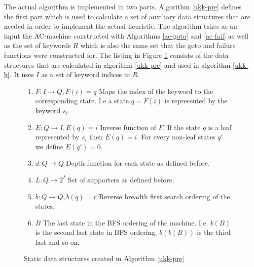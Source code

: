 \documentclass[english,twoside,censored,csm,algorithms-track-2020]{HYthesisML}
\theoremstyle{plain}
\theoremstyle{definition}
\begin{document}
The actual algorithm is implemented in two parts. Algorithm \ref{ukk-pre} defines the first part
which is used to calculate a set of auxiliary data structures that are needed in order to implement
the actual heuristic. The algorithm takes as an input the AC-machine constructed with
Algorithms \ref{ac-goto} and \ref{ac-fail} as well as the set of keywords $R$ which is also
the same set that the goto and failure functions were constructed for. 
The listing in Figure \ref{lst-auxiliary-data} consists of the data structures that are calculated
in algorithm \ref{ukk-pre} and used in algorithm \ref{ukk-h}. It uses $I$ as
a set of keyword indices in $R$.

\begin{figure}[h!]
\begin{enumerate}
  \item $F : I \rightarrow Q, F(i)=q$ Maps the index of the keyword to the corresponding state. I.e a state $q=F(i)$ is represented by the keyword $s_i$.
  \item $E : Q \rightarrow I, E(q)=i$ Inverse function of $F$. If the state $q$ is a leaf represented by $s_i$ then $E(q)=i$. For every non-leaf states $q'$ we define $E(q')=0$.
  \item $d : Q \rightarrow Q$ Depth function for each state as defined before.
  \item $L : Q \rightarrow 2^{I}$ Set of supporters as defined before.
  \item $b : Q \rightarrow Q, b(q)=r$ Reverse breadth first search ordering of the states.
  \item $B$ The last state in the BFS ordering of the machine. I.e. $b(B)$ is the second last state in BFS ordering, $b(b(B))$ is the third last and so on.
\end{enumerate}
\caption{Static data structures created in Algorithm \ref{ukk-pre}} \label{lst-auxiliary-data}
\end{figure}
\end{document}
